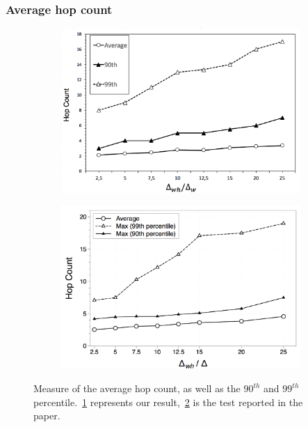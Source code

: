 \documentclass{beamer}
\begin{document}
\begin{frame}
\frametitle{Average hop count}

\begin{figure}
\centering
\begin{subfigure}{.5\textwidth}
  \centering
  \includegraphics[keepaspectratio=true, width=1\linewidth]{images/average_hop_count}
  \caption{}
  \label{fig:my_average_hop_count}
\end{subfigure}%
\begin{subfigure}{.5\textwidth}
  \centering
  \includegraphics[keepaspectratio=true, width=1\linewidth]{images/paper_average_hop_count}
  \caption{}
  \label{fig:paper_average_hop_count}
\end{subfigure}
\caption{Measure of the average hop count, as well as the $90^{th}$ and $99^{th}$ percentile.~\ref{fig:my_average_hop_count} represents our result,~\ref{fig:paper_average_hop_count} is the test reported in the paper.}
\label{fig:freshness}
\end{figure}
\end{frame}
\end{document}

